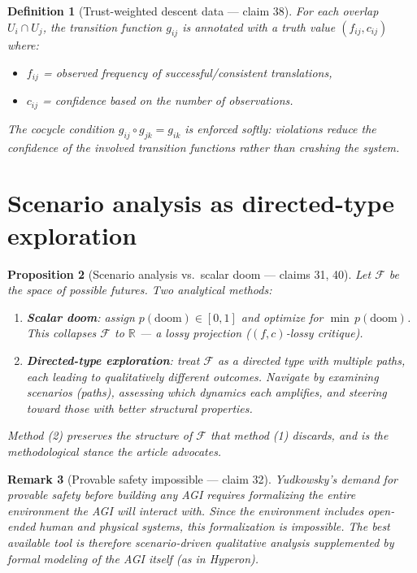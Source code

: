 \documentclass[11pt,a4paper]{article}
\newtheorem{definition}{Definition}[section]
\newtheorem{proposition}[definition]{Proposition}
\newtheorem{remark}[definition]{Remark}
\begin{document}
\begin{definition}[Trust-weighted descent data --- claim 38]
\label{def:trust-descent}
For each overlap $U_i \cap U_j$, the transition function $g_{ij}$ is
annotated with a truth value $(f_{ij}, c_{ij})$ where:
\begin{itemize}
\item $f_{ij}$ = observed frequency of successful/consistent translations,
\item $c_{ij}$ = confidence based on the number of observations.
\end{itemize}
The cocycle condition $g_{ij} \circ g_{jk} = g_{ik}$ is enforced
\emph{softly}: violations reduce the confidence of the involved
transition functions rather than crashing the system.
\end{definition}

\section{Scenario analysis as directed-type exploration}
\label{sec:scenario}

\begin{proposition}[Scenario analysis vs.\ scalar doom --- claims 31, 40]
\label{prop:scenario}
Let $\mathcal{F}$ be the space of possible futures. Two analytical methods:
\begin{enumerate}
\item \textbf{Scalar doom}: assign $p(\text{doom}) \in [0,1]$ and optimize
  for $\min\, p(\text{doom})$. This collapses $\mathcal{F}$ to $\mathbb{R}$
  --- a lossy projection ($(f,c)$-lossy critique).
\item \textbf{Directed-type exploration}: treat $\mathcal{F}$ as a directed
  type with multiple paths, each leading to qualitatively different outcomes.
  Navigate by examining scenarios (paths), assessing which dynamics each
  amplifies, and steering toward those with better structural properties.
\end{enumerate}
Method (2) preserves the structure of $\mathcal{F}$ that method (1) discards,
and is the methodological stance the article advocates.
\end{proposition}

\begin{remark}[Provable safety impossible --- claim 32]
Yudkowsky's demand for provable safety before building any AGI requires
formalizing the entire environment the AGI will interact with. Since the
environment includes open-ended human and physical systems, this
formalization is impossible. The best available tool is therefore
scenario-driven qualitative analysis supplemented by formal modeling
of the AGI itself (as in Hyperon).
\end{remark}
\end{document}
